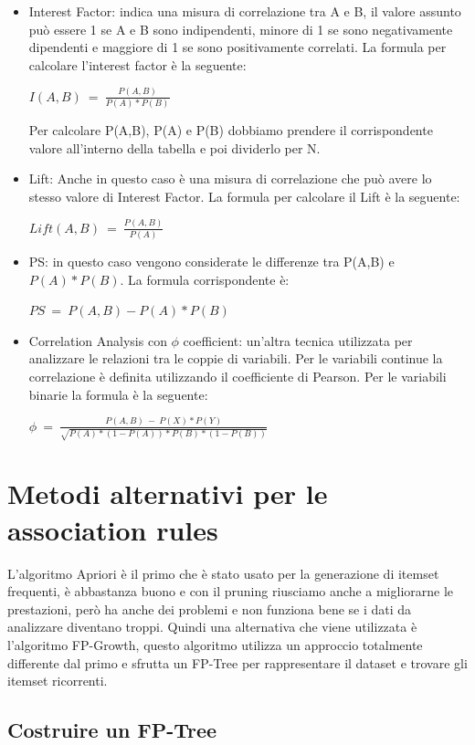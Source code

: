 \documentclass[14pt]{extreport}
\begin{document}
\begin{itemize}
    \item Interest Factor: indica una misura di correlazione tra A e B, il valore assunto può essere 1 se A e B sono indipendenti, minore di 1 se sono negativamente dipendenti e maggiore di 1 se sono positivamente correlati.
    La formula per calcolare l'interest factor è la seguente:
    \newline
    \centerline{$I(A,B)\ =\ \frac{P(A,B)}{P(A)*P(B)} $}
    Per calcolare P(A,B), P(A) e P(B) dobbiamo prendere il corrispondente valore all'interno della tabella e poi dividerlo per N.
    \item Lift: Anche in questo caso è una misura di correlazione che può avere lo stesso valore di Interest Factor.
    La formula per calcolare il Lift è la seguente:
    \newline
    \centerline{$Lift(A,B)\ =\ \frac{P(A,B)}{P(A)} $}
    \item PS: in questo caso vengono considerate le differenze tra P(A,B) e $P(A)*P(B)$.
    La formula corrispondente è:
    \newline
    \centerline{$PS\ =\ P(A,B) - P(A)*P(B)$}
    \item Correlation Analysis con $\phi$ coefficient: un'altra tecnica utilizzata per analizzare le relazioni tra le coppie di variabili.
    Per le variabili continue la correlazione è definita utilizzando il coefficiente di Pearson.
    Per le variabili binarie la formula è la seguente:
    \newline
    \centerline{$\phi\ =\ \frac{P(A,B)\ -\ P(X)*P(Y)}{\sqrt{P(A)*(1-P(A))*P(B)*(1-P(B))}}$}
\end{itemize}

\newpage
\section{Metodi alternativi per le association rules}

L'algoritmo Apriori è il primo che è stato usato per la generazione di itemset frequenti, è abbastanza buono e con il pruning riusciamo anche a migliorarne le prestazioni, però ha anche dei problemi e non funziona bene se i dati da analizzare diventano troppi.
Quindi una alternativa che viene utilizzata è l'algoritmo FP-Growth, questo algoritmo utilizza un approccio totalmente differente dal primo e sfrutta un FP-Tree per rappresentare il dataset e trovare gli itemset ricorrenti.

\subsection{Costruire un FP-Tree}
\end{document}
